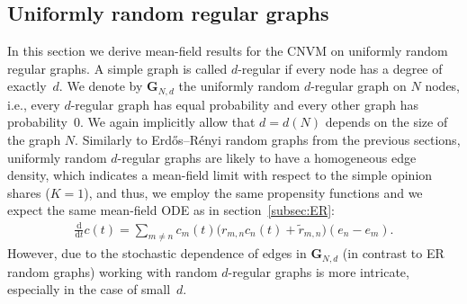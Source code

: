 \documentclass[a4paper,
               10pt,
               pdftex,
               normalheadings,
               headsepline,
               footsepline,
               headinclude,
               footinclude,
               DIV=14,
               abstracton]
{scrartcl}
\newcommand{\rv}[1]{\bm{#1}}
\newcommand{\diff}{\mathrm{d}}
\newcommand{\review}[1]{{#1}}
\begin{document}
\subsection{Uniformly random regular graphs} \label{subsec:regular}
In this section we derive mean-field results for the CNVM on uniformly random regular graphs.
A simple graph is called $d$-regular if every node has a degree of exactly~$d$.
We denote by $\rv{G}_{N,d}$ the uniformly random $d$-regular graph on $N$ nodes, i.e., every $d$-regular graph has equal probability and every other graph has probability~$0$.
\review{We again implicitly allow that $d = d(N)$ depends on the size of the graph $N$.}
Similarly to Erd\H{o}s--Rényi random graphs from the previous sections, uniformly random $d$-regular graphs are likely to have a homogeneous edge density, which indicates a mean-field limit with respect to the simple opinion shares ($K=1$), and thus, we employ the same propensity functions and we expect the same mean-field ODE as in section~\ref{subsec:ER}:
\begin{align} \label{eq:MFE_regular}
    \frac{\diff}{\diff t} c(t) = \sum_{m \neq n} c_m(t) \big(r_{m, n} c_n(t) +  \tilde{r}_{m,n} \big) (e_n - e_m).
\end{align}
However, due to the stochastic dependence of edges in $\rv{G}_{N,d}$ (in contrast to ER random graphs) working with random $d$-regular graphs is more intricate, especially in the case of small~$d$.
\end{document}

